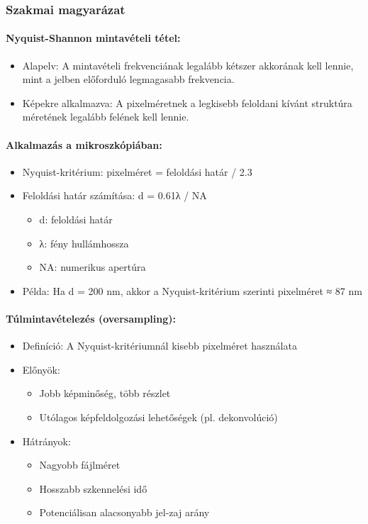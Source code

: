 \documentclass[a4paper,12pt]{article}
\begin{document}
\subsubsection{Szakmai magyarázat}

\paragraph{Nyquist-Shannon mintavételi tétel:} \begin{itemize} \item Alapelv: A mintavételi frekvenciának legalább kétszer akkorának kell lennie, mint a jelben előforduló legmagasabb frekvencia. \item Képekre alkalmazva: A pixelméretnek a legkisebb feloldani kívánt struktúra méretének legalább felének kell lennie. \end{itemize}

\paragraph{Alkalmazás a mikroszkópiában:} \begin{itemize} \item Nyquist-kritérium: pixelméret = feloldási határ / 2.3 \item Feloldási határ számítása: d = 0.61λ / NA \begin{itemize} \item d: feloldási határ \item λ: fény hullámhossza \item NA: numerikus apertúra \end{itemize} \item Példa: Ha d = 200 nm, akkor a Nyquist-kritérium szerinti pixelméret ≈ 87 nm \end{itemize}

\paragraph{Túlmintavételezés (oversampling):} \begin{itemize} \item Definíció: A Nyquist-kritériumnál kisebb pixelméret használata \item Előnyök: \begin{itemize} \item Jobb képminőség, több részlet \item Utólagos képfeldolgozási lehetőségek (pl. dekonvolúció) \end{itemize} \item Hátrányok: \begin{itemize} \item Nagyobb fájlméret \item Hosszabb szkennelési idő \item Potenciálisan alacsonyabb jel-zaj arány \end{itemize} \end{itemize}
\end{document}
